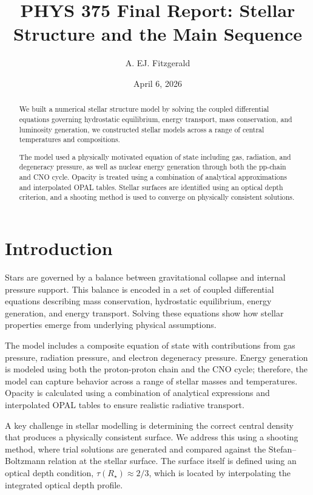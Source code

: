 \documentclass[12pt]{article}
\title{PHYS 375 Final Report: Stellar Structure and the Main Sequence}
\author{A. EJ. Fitzgerald}
\affil{Department of Physics and Astronomy}
\affil{University of Waterloo}
\date{April 6, 2026}
\begin{document}
\maketitle
\begin{abstract}

We built a numerical stellar structure model by solving the coupled differential equations governing hydrostatic equilibrium, energy transport, mass conservation, and luminosity generation, we constructed stellar models across a range of central temperatures and compositions.

The model used a physically motivated equation of state including gas, radiation, and degeneracy pressure, as well as nuclear energy generation through both the pp-chain and CNO cycle. Opacity is treated using a combination of analytical approximations and interpolated OPAL tables. Stellar surfaces are identified using an optical depth criterion, and a shooting method is used to converge on physically consistent solutions.


\end{abstract}
\tableofcontents
\clearpage
\clearpage


\section{Introduction}

Stars are governed by a balance between gravitational collapse and internal pressure support. This balance is encoded in a set of coupled differential equations describing mass conservation, hydrostatic equilibrium, energy generation, and energy transport. Solving these equations show how stellar properties emerge from underlying physical assumptions.

The model includes a composite equation of state with contributions from gas pressure, radiation pressure, and electron degeneracy pressure. Energy generation is modeled using both the proton-proton chain and the CNO cycle; therefore,  the model can capture behavior across a range of stellar masses and temperatures. Opacity is calculated using a combination of analytical expressions and interpolated OPAL tables to ensure realistic radiative transport.

A key challenge in stellar modelling is determining the correct central density that produces a physically consistent surface. We address this using a shooting method, where trial solutions are generated and compared against the Stefan–Boltzmann relation at the stellar surface. The surface itself is defined using an optical depth condition, $\tau(R_\star) \approx 2/3$, which is located by interpolating the integrated optical depth profile.
\end{document}
